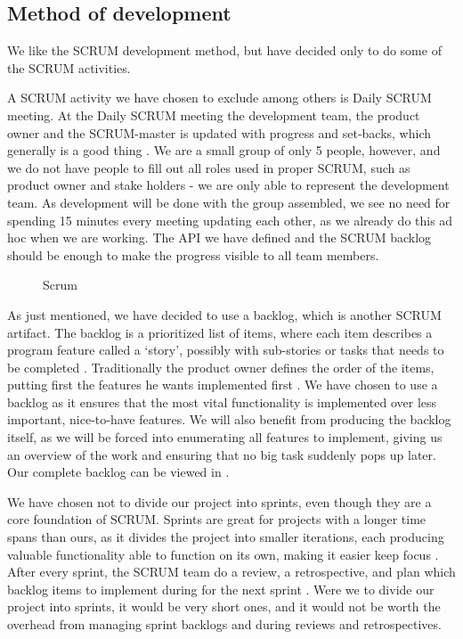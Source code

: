 \subsection{Method of development}
We like the SCRUM development method, but have decided only to do some of the SCRUM activities.

A SCRUM activity we have chosen to exclude among others is Daily SCRUM meeting.
At the Daily SCRUM meeting the development team, the product owner and the SCRUM-master is updated with progress and set-backs, which generally is a good thing \cite[p. ?]{?}.
We are a small group of only 5 people, however, and we do not have people to fill out all roles used in proper SCRUM, such as product owner and stake holders - we are only able to represent the development team.
As development will be done with the group assembled, we see no need for spending 15 minutes every meeting updating each other, as we already do this ad hoc when we are working.
The API we have defined and the SCRUM backlog should be enough to make the progress visible to all team members.

\begin{figure}[H]
  \caption{Scrum}
  \label{scrum_picture}
\end{figure}

As just mentioned, we have decided to use a backlog, which is another SCRUM artifact.
The backlog is a prioritized list of items, where each item describes a program feature called a `story', possibly with sub-stories or tasks that needs to be completed \cite[p. ?]{?}. Traditionally the product owner defines the order of the items, putting first the features he wants implemented first \cite[p. ?]{?}.
We have chosen to use a backlog as it ensures that the most vital functionality is implemented over less important, nice-to-have features. We will also benefit from producing the backlog itself, as we will be forced into enumerating all features to implement, giving us an overview of the work and ensuring that no big task suddenly pops up later.
Our complete backlog can be viewed in .

We have chosen not to divide our project into sprints, even though they are a core foundation of SCRUM.
Sprints are great for projects with a longer time spans than ours, as it divides the project into smaller iterations, each producing valuable functionality able to function on its own, making it easier keep focus \cite[p. ?]{?}.
After every sprint, the SCRUM team do a review, a retrospective, and plan which backlog items to implement during for the next sprint \cite[p. ?]{?}.
Were we to divide our project into sprints, it would be very short ones, and it would not be worth the overhead from managing sprint backlogs and during reviews and retrospectives.

